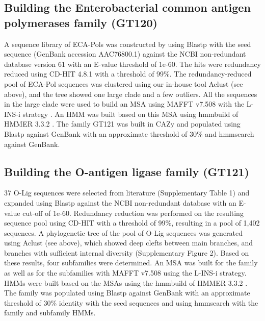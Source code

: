 \documentclass{article}
\begin{document}
\subsection{Building the Enterobacterial common antigen polymerases family (GT120)}
A sequence library of ECA-Pols was constructed by using Blastp with the seed sequence (GenBank accession AAC76800.1) against the NCBI non-redundant database version 61 with an E-value threshold of 1e-60. The hits were redundancy reduced using CD-HIT 4.8.1 \cite{li_cd-hit_2006} with a threshold of 
99\%. The redundancy-reduced pool of ECA-Pol sequences was clustered using our in-house tool Aclust (see above), and the tree showed one large clade and a few outliers. All the sequences in the large clade were used to build an MSA using MAFFT v7.508 with the L-INS-i strategy \cite{katoh_mafft_2013}. An HMM was built based on this MSA using hmmbuild of HMMER 3.3.2 \cite{finn_hmmer_2011}. The family GT121 was built in CAZy and populated using Blastp against GenBank with an approximate threshold of 30\% and hmmsearch against GenBank.

\subsection{Building the O-antigen ligase family (GT121)}
37 O-Lig sequences were selected from literature (Supplementary Table 1) and expanded using Blastp against the NCBI non-redundant database with an E-value cut-off of 1e-60. Redundancy reduction was performed on the resulting sequence pool using CD-HIT with a threshold of 99\%, resulting in a pool of 1,402 sequences. A phylogenetic tree of the pool of O-Lig sequences was generated using Aclust (see above), which showed deep clefts between main branches, and branches with sufficient internal diversity (Supplementary Figure 2). Based on these results, four subfamilies were determined. An MSA was built for the family as well as for the subfamilies with MAFFT v7.508 using the L-INS-i strategy. HMMs were built based on the MSAs using the hmmbuild of HMMER 3.3.2 \cite{finn_hmmer_2011}. The family was populated using Blastp against GenBank with an approximate threshold of 30\% identity with the seed sequences and using hmmsearch with the family and subfamily HMMs.
\end{document}
